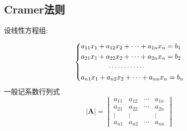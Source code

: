 \subsection{Cramer法则}
设线性方程组:

\[
\left\{
    \begin{lgathered}
        a_{11}x_1 + a_{12}x_2 + \cdots +a_{1n}x_n = b_1\\
        a_{21}x_1 + a_{22}x_2 + \cdots +a_{2n}x_n = b_2\\
        \qquad\qquad\cdots\cdots\cdots\cdots\\
        a_{n1}x_1 + a_{n2}x_2 + \cdots +a_{nn}x_n = b_n   
    \end{lgathered}
\right.
\]\vfill
一般记系数行列式
\[
\left|\bm{A}\right|=\begin{vmatrix}
    a_{11}&a_{12}&\cdots&a_{1n}\\
    a_{21}&a_{22}&\cdots&a_{2n}\\
    \vdots&\vdots& &\vdots\\
    a_{n1}&a_{n2}&\cdots&a_{nn}
\end{vmatrix}
\]
